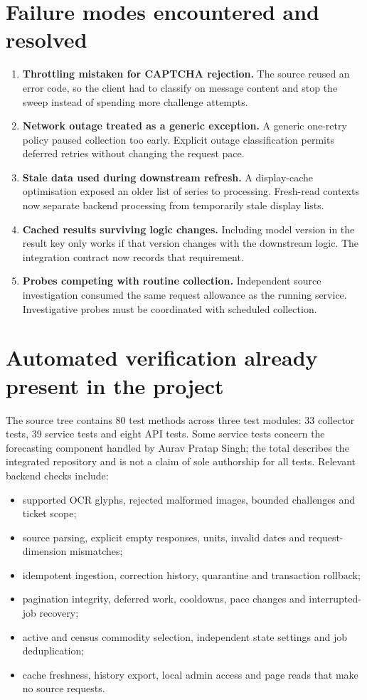\documentclass[12pt,a4paper,oneside]{report}
\newcommand{\auravname}{Aurav Pratap Singh}
\numberwithin{equation}{chapter}
\numberwithin{figure}{chapter}
\numberwithin{table}{chapter}
\theoremstyle{definition}
\begin{document}
\section{Failure modes encountered and resolved}
\label{sec:failures}
\begin{enumerate}
  \item \textbf{Throttling mistaken for CAPTCHA rejection.} The source reused an error code, so the client had to classify on message content and stop the sweep instead of spending more challenge attempts.
  \item \textbf{Network outage treated as a generic exception.} A generic one-retry policy paused collection too early. Explicit outage classification permits deferred retries without changing the request pace.
  \item \textbf{Stale data used during downstream refresh.} A display-cache optimisation exposed an older list of series to processing. Fresh-read contexts now separate backend processing from temporarily stale display lists.
  \item \textbf{Cached results surviving logic changes.} Including model version in the result key only works if that version changes with the downstream logic. The integration contract now records that requirement.
  \item \textbf{Probes competing with routine collection.} Independent source investigation consumed the same request allowance as the running service. Investigative probes must be coordinated with scheduled collection.
\end{enumerate}

\section{Automated verification already present in the project}
The source tree contains 80 test methods across three test modules: 33 collector tests, 39 service tests and eight API tests. Some service tests concern the forecasting component handled by \auravname; the total describes the integrated repository and is not a claim of sole authorship for all tests. Relevant backend checks include:
\begin{itemize}
  \item supported OCR glyphs, rejected malformed images, bounded challenges and ticket scope;
  \item source parsing, explicit empty responses, units, invalid dates and request-dimension mismatches;
  \item idempotent ingestion, correction history, quarantine and transaction rollback;
  \item pagination integrity, deferred work, cooldowns, pace changes and interrupted-job recovery;
  \item active and census commodity selection, independent state settings and job deduplication;
  \item cache freshness, history export, local admin access and page reads that make no source requests.
\end{itemize}
\end{document}
